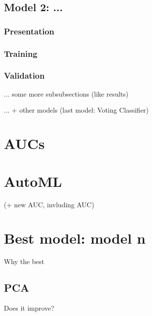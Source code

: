 \subsection{Model 2: ...}
\subsubsection{Presentation}
\subsubsection{Training}
\subsubsection{Validation}
... some more subsubsections (like results)

... + other models (last model: Voting Classifier)

\section{AUCs}

\section{AutoML}
(+ new AUC, invluding AUC)


\section{Best model: model n}
Why the best
\subsection{PCA}
Does it improve?







